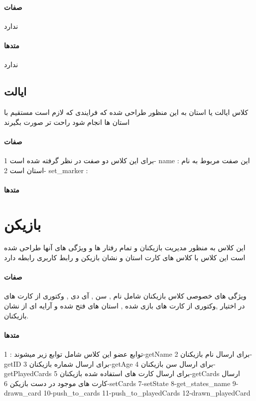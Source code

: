 \documentclass[pdf,titlepage,a4paper]{report}
\begin{document}
	\paragraph{صفات}
	ندارد
	\paragraph{متدها}
	ندارد
	
	\subsection{ایالت}
	کلاس ایالت یا استان به این منظور طراحی شده که فرایندی که لازم است مستقیم با استان ها انجام شود راحت تر صورت بگیرند 

	\paragraph{صفات}
	 برای این کلاس دو صفت در نظر گرفته شده است
	 1- name : این صفت مربوط به نام استان است
	 2- set_marker :
	\paragraph{متدها}
	
	\section{بازیکن}
	این کلاس به منظور مدیریت بازیکنان و تمام رفتار ها و ویژگی های آنها طراحی شده است 
	 این کلاس با کلاس های کارت استان و نشان بازیکن و رابط کاربری رابطه دارد
	\paragraph{صفات}
	ویژگی های خصوصی کلاس بازیکنان شامل نام , سن , آی دی , وکتوری از کارت های در اختیار ,وکتوری از کارت های بازی شده , استان های فتح شده و آرایه ای از نشان بازیکنان.

	\paragraph{متدها}
	توابع عضو این کلاس شامل توابع زیر میشوند :
	1-getName برای ارسال نام بازیکنان
	2-getID برای ارسال شماره بازیکنان
	3-getAge برای ارسال سن بازیکنان
	4-getPlayedCards برای ارسال کارت های استفاده شده بازیکنان
	5-getCards ارسال کارت های موجود در دست بازیکن
	6-setCards 
	7-setState
	8-get_states_name
	9-drawn_card
	10-push_to_cards
	11-push_to_playedCards
	12-drawn_playedCard
	\newpage
	
	
	
\end{document}
